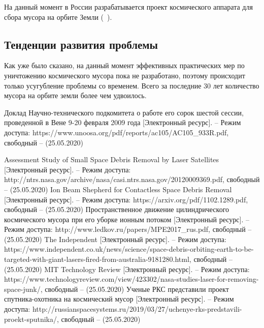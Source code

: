 \documentclass[a4paper,12pt]{article}
\begin{document}
	На данный момент в России разрабатывается проект космического аппарата для сбора мусора на орбите Земли  (~\cite{6}).
	
	\subsection*{Тенденции развития проблемы}

	Как уже было сказано, на данный момент эффективных практических мер по уничтожению космического мусора пока не разработано, поэтому происходит только усугубление проблемы со временем. Всего за последние 30 лет количество мусора на орбите земли более чем удвоилось.

	\pagebreak
	
	\begin{thebibliography}{}
		
		Доклад Научно-технического подкомитета о работе
		его сорок шестой сессии, проведенной в Вене
		9-20 февраля 2009 года
		[Электронный ресурс]. – Режим доступа: 
		https://www.unoosa.org/pdf/reports/ac105/AC105\_933R.pdf, свободный – 
		(25.05.2020)
		
		Assessment Study of Small Space Debris Removal by Laser Satellites
		[Электронный ресурс]. – Режим доступа: 
		http://ntrs.nasa.gov/archive/nasa/casi.ntrs.nasa.gov/20120009369.pdf, свободный – 
		(25.05.2020)
		Ion Beam Shepherd for Contactless Space Debris Removal
		[Электронный ресурс]. – Режим доступа: 
		https://arxiv.org/pdf/1102.1289.pdf, свободный – 
		(25.05.2020)
		Пространственное движение цилиндрического космического мусора при его уборке
		ионным потоком
		[Электронный ресурс]. – Режим доступа: 
		http://www.ledkov.ru/papers/MPE2017\_rus.pdf, свободный – 
		(25.05.2020)
		The Independent
		[Электронный ресурс]. – Режим доступа: 
		https://www.independent.co.uk/news/science/space-debris-orbiting-earth-to-be-targeted-with-giant-lasers-fired-from-australia-9181280.html, свободный – 
		(25.05.2020)
		MIT Technology Review
		[Электронный ресурс]. – Режим доступа: 
		https://www.technologyreview.com/view/423302/nasa-studies-laser-for-removing-space-junk/, свободный – 
		(25.05.2020)
		Ученые РКС представили проект спутника-охотника на космический мусор
		[Электронный ресурс]. – Режим доступа: 
		http://russianspacesystems.ru/2019/03/27/uchenye-rks-predstavili-proekt-sputnika/, свободный – 
		(25.05.2020)
	\end{thebibliography}
\end{document}
